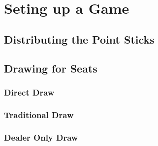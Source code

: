 \section{Seting up a Game}\label{core:sec:hanchan}

\subsection{Distributing the Point Sticks}\label{core:ssec:distribute-sticks}

\subsection{Drawing for Seats}\label{core:ssec:seat-draw}

\subsubsection{Direct Draw}\label{core:sssec:direct-draw}

\subsubsection{Traditional Draw}\label{core:sssec:traditional-draw}

\subsubsection{Dealer Only Draw}\label{core:sssec:dealer-only-draw}
